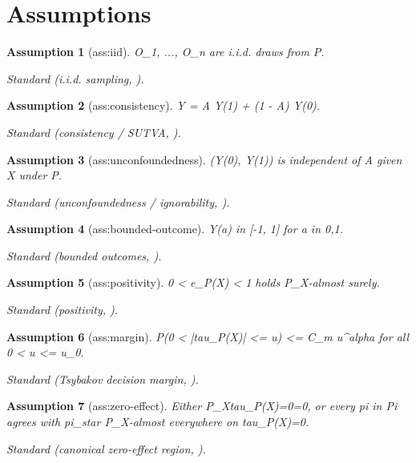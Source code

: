 \documentclass{article}
\newtheorem{assumption}{Assumption}
\begin{document}
\section{Assumptions}

\begin{assumption}[ass:iid]\label{ass:iid}
O_1, ..., O_n are i.i.d. draws from P.
\par\smallskip\noindent\emph{Standard} (i.i.d. sampling, \cite{AtheyWager2021PolicyLearning}).
\end{assumption}

\begin{assumption}[ass:consistency]\label{ass:consistency}
Y = A Y(1) + (1 - A) Y(0).
\par\smallskip\noindent\emph{Standard} (consistency / SUTVA, \cite{ImbensRubin2015}).
\end{assumption}

\begin{assumption}[ass:unconfoundedness]\label{ass:unconfoundedness}
(Y(0), Y(1)) is independent of A given X under P.
\par\smallskip\noindent\emph{Standard} (unconfoundedness / ignorability, \cite{ImbensRubin2015}).
\end{assumption}

\begin{assumption}[ass:bounded-outcome]\label{ass:bounded-outcome}
Y(a) in [-1, 1] for a in {0,1}.
\par\smallskip\noindent\emph{Standard} (bounded outcomes, \cite{AtheyWager2021PolicyLearning}).
\end{assumption}

\begin{assumption}[ass:positivity]\label{ass:positivity}
0 < e_P(X) < 1 holds P_X-almost surely.
\par\smallskip\noindent\emph{Standard} (positivity, \cite{ImbensRubin2015}).
\end{assumption}

\begin{assumption}[ass:margin]\label{ass:margin}
P(0 < |tau_P(X)| <= u) <= C_m u^alpha for all 0 < u <= u_0.
\par\smallskip\noindent\emph{Standard} (Tsybakov decision margin, \cite{Tsybakov2004OptimalAggregation}).
\end{assumption}

\begin{assumption}[ass:zero-effect]\label{ass:zero-effect}
Either P_X{tau_P(X)=0}=0, or every pi in Pi agrees with pi_star P_X-almost everywhere on {tau_P(X)=0}.
\par\smallskip\noindent\emph{Standard} (canonical zero-effect region, \cite{Tsybakov2004OptimalAggregation}).
\end{assumption}
\end{document}
